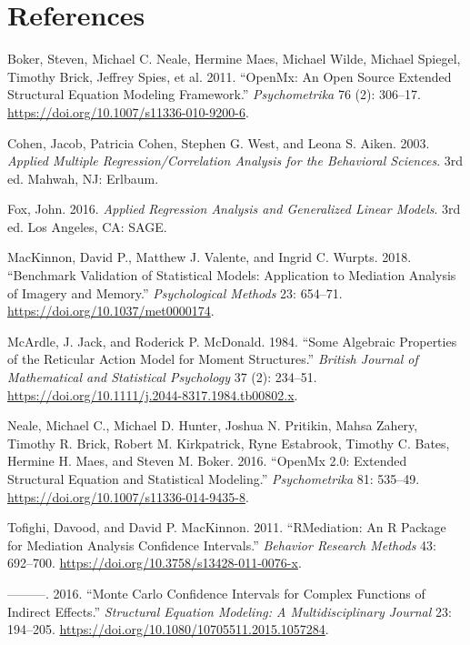\documentclass[11pt,]{article}
\begin{document}
\hypertarget{references}{%
\section*{References}\label{references}}

\hypertarget{refs}{}
\leavevmode\hypertarget{ref-boker2011}{}%
Boker, Steven, Michael C. Neale, Hermine Maes, Michael Wilde, Michael
Spiegel, Timothy Brick, Jeffrey Spies, et al. 2011. ``OpenMx: An Open
Source Extended Structural Equation Modeling Framework.''
\emph{Psychometrika} 76 (2): 306--17.
\url{https://doi.org/10.1007/s11336-010-9200-6}.

\leavevmode\hypertarget{ref-cohen2003}{}%
Cohen, Jacob, Patricia Cohen, Stephen G. West, and Leona S. Aiken. 2003.
\emph{Applied Multiple Regression/Correlation Analysis for the
Behavioral Sciences}. 3rd ed. Mahwah, NJ: Erlbaum.

\leavevmode\hypertarget{ref-fox2016}{}%
Fox, John. 2016. \emph{Applied Regression Analysis and Generalized
Linear Models}. 3rd ed. Los Angeles, CA: SAGE.

\leavevmode\hypertarget{ref-mackinnon2018}{}%
MacKinnon, David P., Matthew J. Valente, and Ingrid C. Wurpts. 2018.
``Benchmark Validation of Statistical Models: Application to Mediation
Analysis of Imagery and Memory.'' \emph{Psychological Methods} 23:
654--71. \url{https://doi.org/10.1037/met0000174}.

\leavevmode\hypertarget{ref-mcardle1984}{}%
McArdle, J. Jack, and Roderick P. McDonald. 1984. ``Some Algebraic
Properties of the Reticular Action Model for Moment Structures.''
\emph{British Journal of Mathematical and Statistical Psychology} 37
(2): 234--51. \url{https://doi.org/10.1111/j.2044-8317.1984.tb00802.x}.

\leavevmode\hypertarget{ref-neale2016}{}%
Neale, Michael C., Michael D. Hunter, Joshua N. Pritikin, Mahsa Zahery,
Timothy R. Brick, Robert M. Kirkpatrick, Ryne Estabrook, Timothy C.
Bates, Hermine H. Maes, and Steven M. Boker. 2016. ``OpenMx 2.0:
Extended Structural Equation and Statistical Modeling.''
\emph{Psychometrika} 81: 535--49.
\url{https://doi.org/10.1007/s11336-014-9435-8}.

\leavevmode\hypertarget{ref-tofighi2011}{}%
Tofighi, Davood, and David P. MacKinnon. 2011. ``RMediation: An R
Package for Mediation Analysis Confidence Intervals.'' \emph{Behavior
Research Methods} 43: 692--700.
\url{https://doi.org/10.3758/s13428-011-0076-x}.

\leavevmode\hypertarget{ref-tofighi2016a}{}%
---------. 2016. ``Monte Carlo Confidence Intervals for Complex
Functions of Indirect Effects.'' \emph{Structural Equation Modeling: A
Multidisciplinary Journal} 23: 194--205.
\url{https://doi.org/10.1080/10705511.2015.1057284}.
\end{document}
